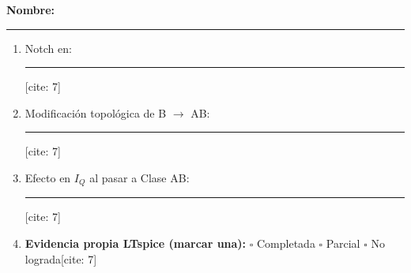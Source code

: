 \documentclass[11pt, a4paper]{article}
\begin{document}
\vspace{0.5cm}
\begin{tcolorbox}[colback=white, colframe=black, title=\textbf{Ticket de Comprobación Individual}]
    \textbf{Nombre:} \rule{8cm}{0.4pt}
    \vspace{0.3cm}
    
    \begin{enumerate}
        \item Notch en: \rule{10cm}{0.4pt}[cite: 7]
        \item Modificación topológica de B $\to$ AB: \rule{7cm}{0.4pt}[cite: 7]
        \item Efecto en $I_Q$ al pasar a Clase AB: \rule{7cm}{0.4pt}[cite: 7]
        \item \textbf{Evidencia propia LTspice (marcar una):} $\square$ Completada \quad $\square$ Parcial \quad $\square$ No lograda[cite: 7]
    \end{enumerate}
\end{tcolorbox}
\end{document}
